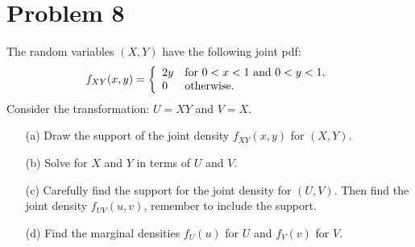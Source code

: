 \documentclass{article}
\newcommand{\1}{\mathbf{1}}
\begin{document}
\newpage
\section*{Problem 8} The random variables $(X,Y)$ have the following joint pdf:
\[
f_{XY}(x,y) =\left\{\begin{array}{ll}
2y & \hbox{for } 0 < x < 1 \hbox{ and } 0 < y <1,\\ 
0 & \hbox{otherwise.}
\end{array}
\right.
\]
Consider the transformation: $U = XY$ and $ V=X$.

\begin{itemize}
\item[(a)] Draw the support of the joint density $f_{XY}(x,y)$ for $(X,Y)$.

\item[(b)] Solve for $X$ and $Y$ in terms of $U$ and $V$.

\item[(c)] Carefully find the support for the joint density for $(U,V)$.
 Then find the joint density $f_{UV}(u,v)$, remember to include the support.
\item[(d)] Find the marginal densities $f_U(u)$ for $U$ and  $f_V(v)$ for $V$.


\end{itemize}
\end{document}
